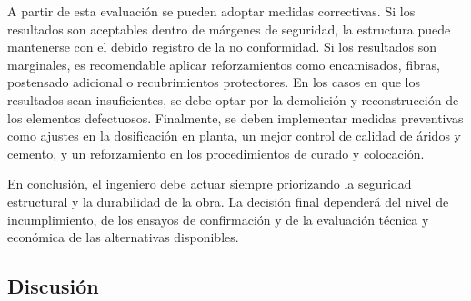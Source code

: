 A partir de esta evaluación se pueden adoptar medidas correctivas. Si los resultados son aceptables dentro de márgenes de seguridad, la estructura puede mantenerse con el debido registro de la no conformidad. Si los resultados son marginales, es recomendable aplicar reforzamientos como encamisados, fibras, postensado adicional o recubrimientos protectores. En los casos en que los resultados sean insuficientes, se debe optar por la demolición y reconstrucción de los elementos defectuosos. Finalmente, se deben implementar medidas preventivas como ajustes en la dosificación en planta, un mejor control de calidad de áridos y cemento, y un reforzamiento en los procedimientos de curado y colocación.

En conclusión, el ingeniero debe actuar siempre priorizando la seguridad estructural y la durabilidad de la obra. La decisión final dependerá del nivel de incumplimiento, de los ensayos de confirmación y de la evaluación técnica y económica de las alternativas disponibles.


\subsection{Discusión}

